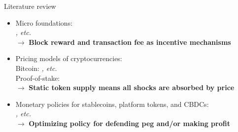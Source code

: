 \documentclass{beamer}
\begin{document}
\begin{frame}{Literature review}
    \begin{itemize}
        \item Micro foundations:\\
        {\footnotesize \textit{\citet{nisan2007algorithmic, budish2018economic, biais2019blockchain, gans2019more, gans2022mechanism, huberman2021monopoly}, etc.}}\\
        $\rightarrow$ \textbf{Block reward and transaction fee as incentive mechanisms}

        \item Pricing models of cryptocurrencies:\\
        {\footnotesize Bitcoin: \textit{\citet{athey2016bitcoin, garratt2018bitcoin, schilling2019some, schilling2019currency, catalini2020some, biais2023equilibrium, bolt2020value, hinzen2022bitcoin, chiu2017economics}, etc.}}\\
        {\footnotesize Proof-of-stake: \textit{\citet{catalini2020markets, saleh2019volatility, saleh2021blockchain}}}\\
        $\rightarrow$ \textbf{Static token supply means all shocks are absorbed by price}
        \item Monetary policies for stablecoins, platform tokens, and CBDCs:\\
        {\footnotesize \textit{\citet{cong2021tokenomics, cong2022token, cong2022staking, d2022can, fernandez2021central, zhu2019framework, sockin2023model, sockin2023decentralization}, etc.}}\\
        $\rightarrow$ \textbf{Optimizing policy for defending peg and/or making profit}
    \end{itemize}
\end{frame}
\end{document}
